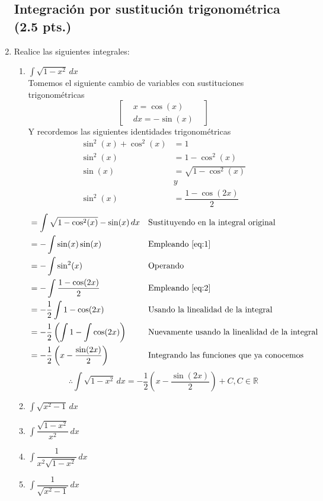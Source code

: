 \documentclass[letterpaper]{article}
\newcommand{\R}{\mathds{R}}
\renewcommand{\*}{\cdot}
\theoremstyle{definition}
\begin{document}
\begin{enumerate}
\subsection*{Integración por sustitución trigonométrica (2.5 pts.)}
\item  Realice las siguientes integrales:
\begin{enumerate}
\item$\displaystyle \int \sqrt{1 - x^2} \, dx$\\
Tomemos el siguiente cambio de variables con sustituciones trigonométricas
\[  \begin{bmatrix}
& x = \cos(x) &\\
&dx = -\sin(x)&
\end{bmatrix} \]
Y recordemos las siguientes identidades trigonométricas
\begin{align*}
	\sin^2(x) + \cos^2(x) &= 1\\
	\sin^2(x) &= 1 - \cos^2(x)\\
	\sin(x) &= \sqrt{1 - \cos^2(x)} \tag{$\alpha$}\label{eq:1} \\ &y  \\
	\sin^2(x) &= \dfrac{1 - \cos(2x)}{2} \tag{$\beta$}\label{eq:2}
\end{align*}
\begin{align*}
	&= \int \sqrt{1 - \cos^2(x)} - \sin(x)\,dx &&\text{Sustituyendo en la integral original}\\
	&= -\int \sin(x)\sin(x) &&\text{Empleando \ref{eq:1}}\\
	&= -\int \sin^2(x) &&\text{Operando}\\
	&= -\int \dfrac{1 - \cos(2x)}{2} &&\text{Empleando \ref{eq:2}}\\
	&= -\dfrac{1}{2}\int 1 - \cos(2x) &&\text{Usando la linealidad de la integral}\\
	&= -\dfrac{1}{2} \left(\int 1 - \int\cos(2x)\right) &&\text{Nuevamente usando la linealidad de la integral}\\
	&= -\dfrac{1}{2} \left(x - \dfrac{\sin(2x)}{2}\right) &&\text{Integrando las funciones que ya conocemos}\\
\end{align*}
\[ \therefore \int \sqrt{1 - x^2} \, dx = -\dfrac{1}{2} \left(x - \dfrac{\sin(2x)}{2}\right) + C, C \in \R \]


\item$\displaystyle \int \sqrt{x^2 - 1} \, dx$
\item$\displaystyle \int \dfrac{\sqrt{1 - x^2}}{x^2} \, dx$
\item$\displaystyle \int  \dfrac{1}{x^2 \sqrt{1 - x^2}} \, dx$
\item$\displaystyle \int  \dfrac{1}{ \sqrt{x^2 - 1}} \, dx$
\end{enumerate}


\end{enumerate}
\end{document}

